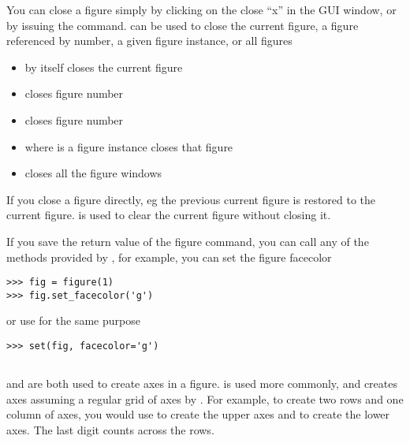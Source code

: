 \documentclass[]{book}
\begin{document}
You can close a figure simply by clicking on the close ``x'' in the
GUI window, or by issuing the  command.   can
be used to close the current figure, a figure referenced by number, a
given figure instance, or all figures

\begin{itemize}

  \item {} by itself closes the current figure

  \item {} closes figure number 

  \item {} closes figure number 
    
  \item {} where  is a figure instance closes
    that figure

  \item {} closes all the figure windows

\end{itemize}
    
\noindent If you close a figure directly, eg  the
previous current figure is restored to the current figure. 
is used to clear the current figure without closing it.

If you save the return value of the figure command, you can call any
of the methods provided by , for
example, you can set the figure facecolor

\begin{lstlisting}
>>> fig = figure(1)
>>> fig.set_facecolor('g')
\end{lstlisting}

or use  for the same purpose

\begin{lstlisting}
>>> set(fig, facecolor='g')
\end{lstlisting}

\subsection{}
\label{sec:subplot}

 and  are both used to create axes in a
figure.   is used more commonly, and creates axes
assuming a  regular grid of axes  by .
For example, to create two rows and one column of axes, you would use
 to create the upper axes and 
to create the lower axes.  The last digit counts across the rows.
\end{document}
